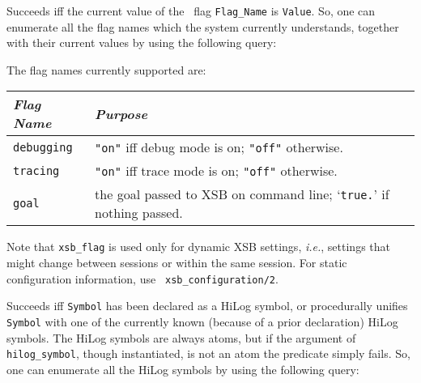 \begin{description}
    Succeeds iff the current value of the \ourprolog\ flag {\tt Flag\_Name} is 
    {\tt Value}. So, one can enumerate all the flag names which the system
    currently understands, together with their current values by using the
    following query:


    The flag names currently supported are:

    \begin{center}
    \begin{tabular}{||l|l||}               \hline
	{\em Flag Name}		& {\em Purpose} \\ \hline \hline
	{\tt debugging}		& 
		{\tt "on"} iff debug mode is on; {\tt "off"} otherwise.\\ \hline
	{\tt tracing}		& 
		{\tt "on"} iff trace mode is on; {\tt "off"} otherwise.\\ \hline
	{\tt goal}		& 
		the goal passed to XSB on command line; `{\tt true.}' if
                nothing passed.\\ \hline
    \end{tabular}
    \end{center}
    
    Note that {\tt xsb\_flag} is used only for dynamic XSB settings, {\it
      i.e.}, settings that might change between sessions or within the same
    session. For static configuration information, use {\tt
      xsb\_configuration/2}.  

    Succeeds iff {\tt Symbol} has been declared as a HiLog symbol, or 
    procedurally unifies {\tt Symbol} with one of the currently known 
    (because of a prior declaration) HiLog symbols. The HiLog symbols
    are always atoms, but if the argument of {\tt hilog\_symbol},
    though instantiated, is not an atom the predicate simply fails.
    So, one can enumerate all the HiLog symbols by using the following
    query:



\end{description}
